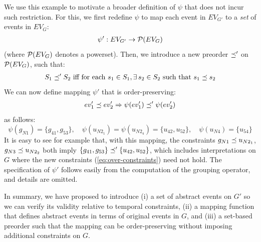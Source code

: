 We use this example to motivate a broader definition of $\psi$ that does not incur such restriction. For this, we first redefine $\psi$ to map each event in $EV_{G'}$ to a \textit{set} of events in $EV_{G}$:
\begin{align}
 \psi': EV_{G'} \rightarrow {\cal P}(EV_{G}) 
\end{align}
(where ${\cal P}(EV_{G})$ denotes a powerset).
%
Then, we introduce a new preorder $\preceq'$ on ${\cal P}(EV_{G})$, such that:
\begin{align}
 S_1 \preorderprime S_2 \text{ iff for each } s_1 \in S_1, \exists s_2 \in S_2 \text{ such that } s_1 \preorder s_2 
 \end{align}
We can now define mapping $\psi'$ that is order-preserving:
\begin{align} 
ev_1' \preceq ev_2' \Rightarrow \psi(ev_1') \preceq' \psi(ev_2')  
\end{align}
as follows:
\begin{equation}
\psi(g_{N1}) = \{ g_{41}, g_{53} \},  \quad  \psi(u_{N2_1}) =  \psi(u_{N2_4}) = \{ u_{42}, u_{52} \}, \quad \psi(u_{N4}) = \{u_{54} \} \label{eq:psi-real}
\end{equation}
It is easy to see for example that, with this mapping, the constraints 
$g_{N1} \preceq u_{N2_1}$, $g_{N3} \preceq u_{N2_2}$ both imply $ \{ g_{41}, g_{53} \} \preceq'  \{ u_{42}, u_{52} \} $,
which includes interpretations on $G$ where the new constraints (\ref{eq:over-constraints}) need not hold.
The specification of $\psi'$ follows easily from the computation of the grouping operator, and details are omitted.

In summary, we have proposed to introduce (i) a set of abstract events on $G'$ so we can verify its validity relative to temporal constraints, (ii) a mapping function that defines abstract events in terms of original events in $G$, and (iii) a set-based preorder such that the mapping can be order-preserving without imposing additional constraints on $G$. 


